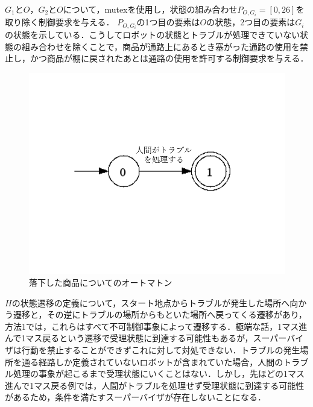 $G_1$と$O$，$G_2$と$O$について，mutexを使用し，状態の組み合わせ$P_{O,G_i}=[0,26]$を取り除く制御要求を与える． $P_{O,G_i}$の1つ目の要素は$O$の状態，2つ目の要素は$G_i$の状態を示している．こうしてロボットの状態とトラブルが処理できていない状態の組み合わせを除くことで，商品が通路上にあるとき塞がった通路の使用を禁止し，かつ商品が棚に戻されたあとは通路の使用を許可する制御要求を与える． 

\begin{figure}[t]
    \centering
    \includegraphics[scale=0.4]{figures/automatonO.png}
    \caption{落下した商品についてのオートマトン}
    \label{fig:automatonO}
\end{figure}

$H$の状態遷移の定義について，スタート地点からトラブルが発生した場所へ向かう遷移と，その逆にトラブルの場所からもといた場所へ戻ってくる遷移があり，方法1では，これらはすべて不可制御事象によって遷移する．極端な話，1マス進んで1マス戻るという遷移で受理状態に到達する可能性もあるが，スーパーバイザは行動を禁止することができずこれに対して対処できない．トラブルの発生場所を通る経路しか定義されていないロボットが含まれていた場合，人間のトラブル処理の事象が起こるまで受理状態にいくことはない．しかし，先ほどの1マス進んで1マス戻る例では，人間がトラブルを処理せず受理状態に到達する可能性があるため，条件を満たすスーパーバイザが存在しないことになる．

